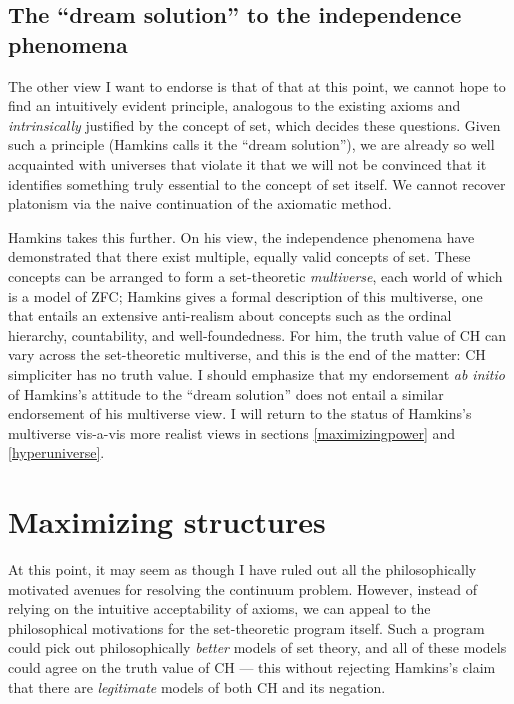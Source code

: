 \documentclass[letterpaper,12pt]{article}
\begin{document}
\subsection{The ``dream solution'' to the independence phenomena}
\label{dreamsolution}
The other view I want to endorse is that of \cite{hamkins2011set} that at this point, we cannot hope to find an intuitively evident principle, analogous to the existing axioms and \emph{intrinsically} justified by the concept of set, which decides these questions. Given such a principle (Hamkins calls it the ``dream solution''), we are already so well acquainted with universes that violate it that we will not be convinced that it identifies something truly essential to the concept of set itself. We cannot recover platonism via the naive continuation of the axiomatic method.

Hamkins takes this further. On his view, the independence phenomena have demonstrated that there exist multiple, equally valid concepts of set. These concepts can be arranged to form a set-theoretic \emph{multiverse}, each world of which is a model of ZFC; Hamkins gives a formal description of this multiverse, one that entails an extensive anti-realism about concepts such as the ordinal hierarchy, countability, and well-foundedness. For him, the truth value of CH can vary across the set-theoretic multiverse, and this is the end of the matter: CH simpliciter has no truth value. I should emphasize that my endorsement \emph{ab initio} of Hamkins's attitude to the ``dream solution'' does not entail a similar endorsement of his multiverse view. I will return to the status of Hamkins's multiverse vis-a-vis more realist views in sections \ref{maximizingpower} and \ref{hyperuniverse}.

\section{Maximizing structures}
\label{maximizingstructures}
At this point, it may seem as though I have ruled out all the philosophically motivated avenues for resolving the continuum problem. However, instead of relying on the intuitive acceptability of axioms, we can appeal to the philosophical motivations for the set-theoretic program itself. Such a program could pick out philosophically \emph{better} models of set theory, and all of these models could agree on the truth value of CH --- this without rejecting Hamkins's claim that there are \emph{legitimate} models of both CH and its negation.
\end{document}
